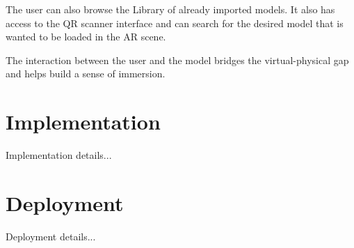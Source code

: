 The user can also browse the Library of already imported models. It also has access to the \ac{QR} scanner interface and can search for the desired model that is wanted to be loaded in the \ac{AR} scene.

The interaction between the user and the model bridges the virtual-physical gap and helps build a sense of immersion.

\clearpage

\section{Implementation}
Implementation details...

\section{Deployment}
Deployment details...
